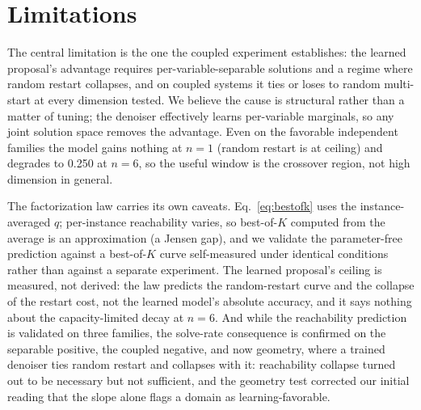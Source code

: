 \documentclass[11pt]{article}
\begin{document}
\section{Limitations}
\label{sec:limitations}

The central limitation is the one the coupled experiment establishes: the learned proposal's
advantage requires per-variable-separable solutions and a regime where random restart
collapses, and on coupled systems it ties or loses to random multi-start at every dimension
tested. We believe the cause is structural rather than a matter of tuning; the denoiser
effectively learns per-variable marginals, so any joint solution space removes the advantage.
Even on the favorable independent families the model gains nothing at $n = 1$ (random restart
is at ceiling) and degrades to 0.250 at $n = 6$, so the useful window is the crossover region,
not high dimension in general.

The factorization law carries its own caveats. Eq.~\eqref{eq:bestofk} uses the
instance-averaged $q$; per-instance reachability varies, so best-of-$K$ computed from the
average is an approximation (a Jensen gap), and we validate the parameter-free prediction
against a best-of-$K$ curve self-measured under identical conditions rather than against a
separate experiment. The learned proposal's ceiling is measured, not derived: the law predicts
the random-restart curve and the collapse of the restart cost, not the learned model's
absolute accuracy, and it says nothing about the capacity-limited decay at $n = 6$. And while
the reachability prediction is validated on three families, the solve-rate consequence is
confirmed on the separable positive, the coupled negative, and now geometry, where a trained
denoiser ties random restart and collapses with it: reachability collapse turned out to be
necessary but not sufficient, and the geometry test corrected our initial reading that the
slope alone flags a domain as learning-favorable.
\end{document}
